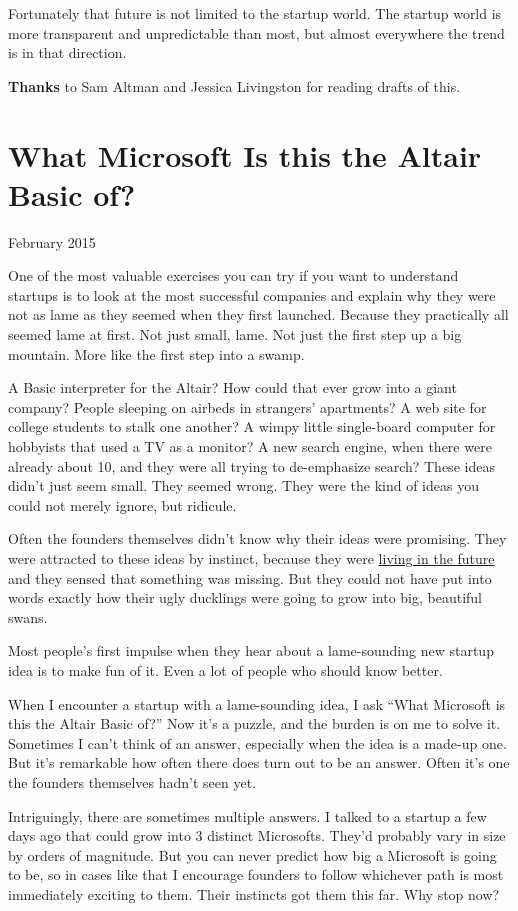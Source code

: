 \documentclass[12pt]{book}
\begin{document}
Fortunately that future is not limited to the startup world. The startup
world is more transparent and unpredictable than most, but almost
everywhere the trend is in that direction.


\textbf{Thanks} to Sam Altman and Jessica Livingston for reading drafts
of this.
\chapter{What Microsoft Is this the Altair Basic of?}

February 2015

One of the most valuable exercises you can try if you want to understand
startups is to look at the most successful companies and explain why
they were not as lame as they seemed when they first launched. Because
they practically all seemed lame at first. Not just small, lame. Not
just the first step up a big mountain. More like the first step into a
swamp.

A Basic interpreter for the Altair? How could that ever grow into a
giant company? People sleeping on airbeds in strangers' apartments? A
web site for college students to stalk one another? A wimpy little
single-board computer for hobbyists that used a TV as a monitor? A new
search engine, when there were already about 10, and they were all
trying to de-emphasize search? These ideas didn't just seem small. They
seemed wrong. They were the kind of ideas you could not merely ignore,
but ridicule.

Often the founders themselves didn't know why their ideas were
promising. They were attracted to these ideas by instinct, because they
were \href{startupideas.html}{living in the future} and they sensed that
something was missing. But they could not have put into words exactly
how their ugly ducklings were going to grow into big, beautiful swans.

Most people's first impulse when they hear about a lame-sounding new
startup idea is to make fun of it. Even a lot of people who should know
better.

When I encounter a startup with a lame-sounding idea, I ask ``What
Microsoft is this the Altair Basic of?'' Now it's a puzzle, and the
burden is on me to solve it. Sometimes I can't think of an answer,
especially when the idea is a made-up one. But it's remarkable how often
there does turn out to be an answer. Often it's one the founders
themselves hadn't seen yet.

Intriguingly, there are sometimes multiple answers. I talked to a
startup a few days ago that could grow into 3 distinct Microsofts.
They'd probably vary in size by orders of magnitude. But you can never
predict how big a Microsoft is going to be, so in cases like that I
encourage founders to follow whichever path is most immediately exciting
to them. Their instincts got them this far. Why stop now?
\end{document}
